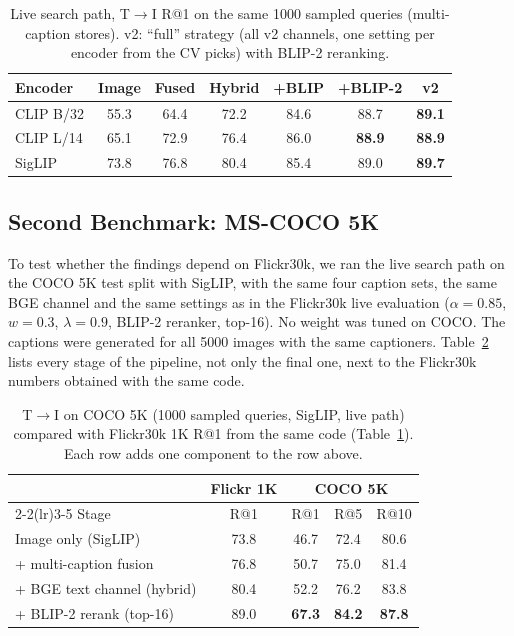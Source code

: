 \documentclass[conference]{IEEEtran}
\newcommand{\RA}{\ensuremath{\rightarrow}}
\newcommand{\best}[1]{\textbf{#1}}
\begin{document}
\begin{table}[t]
\centering
\caption{Live search path, T\RA I R@1 on the same 1000 sampled queries (multi-caption stores). v2: ``full''
strategy (all v2 channels, one setting per encoder from the CV picks) with BLIP-2 reranking.}
\label{tab:online}
\setlength{\tabcolsep}{3pt}
\begin{tabular}{lcccccc}
\toprule
Encoder & Image & Fused & Hybrid & +BLIP & +BLIP-2 & v2 \\
\midrule
CLIP B/32 & 55.3 & 64.4 & 72.2 & 84.6 & 88.7 & \best{89.1} \\
CLIP L/14 & 65.1 & 72.9 & 76.4 & 86.0 & \best{88.9} & \best{88.9} \\
SigLIP    & 73.8 & 76.8 & 80.4 & 85.4 & 89.0 & \best{89.7} \\
\bottomrule
\end{tabular}
\end{table}

\subsection{Second Benchmark: MS-COCO 5K}
To test whether the findings depend on Flickr30k, we ran the live search path on the COCO 5K test split with
SigLIP, with the same four caption sets, the same BGE channel and the same settings as in the Flickr30k live
evaluation ($\alpha=0.85$, $w=0.3$, $\lambda=0.9$, BLIP-2 reranker, top-16). No weight was tuned on COCO. The
captions were generated for all 5000 images with the same captioners. Table~\ref{tab:coco} lists every stage
of the pipeline, not only the final one, next to the Flickr30k numbers obtained with the same code.

\begin{table}[t]
\centering
\caption{T\RA I on COCO 5K (1000 sampled queries, SigLIP, live path) compared with Flickr30k 1K R@1 from the same
code (Table~\ref{tab:online}). Each row adds one component to the row above.}
\label{tab:coco}
\setlength{\tabcolsep}{4pt}
\begin{tabular}{l c ccc}
\toprule
& Flickr 1K & \multicolumn{3}{c}{COCO 5K} \\
\cmidrule(lr){2-2}\cmidrule(lr){3-5}
Stage & R@1 & R@1 & R@5 & R@10 \\
\midrule
Image only (SigLIP)         & 73.8 & 46.7 & 72.4 & 80.6 \\
+ multi-caption fusion      & 76.8 & 50.7 & 75.0 & 81.4 \\
+ BGE text channel (hybrid) & 80.4 & 52.2 & 76.2 & 83.8 \\
+ BLIP-2 rerank (top-16)    & 89.0 & \best{67.3} & \best{84.2} & \best{87.8} \\
\bottomrule
\end{tabular}
\end{table}
\end{document}

